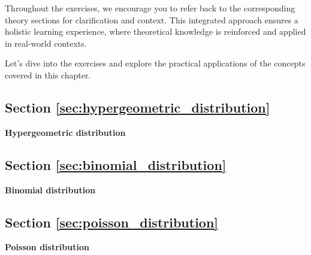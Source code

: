 Throughout the exercises, we encourage you to refer back to the corresponding theory sections for clarification and context. This integrated approach ensures a holistic learning experience, where theoretical knowledge is reinforced and applied in real-world contexts.

Let's dive into the exercises and explore the practical applications of the concepts covered in this chapter.

\subsection{Section \ref{sec:hypergeometric_distribution}}

\begin{exercise}
\label{ex:hyper}

\textbf{Hypergeometric distribution} 







\end{exercise}

\subsection{Section \ref{sec:binomial_distribution}}

\begin{exercise}
\label{ex:binom}

\textbf{Binomial distribution} 


\end{exercise}

\subsection{Section \ref{sec:poisson_distribution}}

\begin{exercise}
\label{ex:poiss}

\textbf{Poisson distribution} 





\end{exercise}

